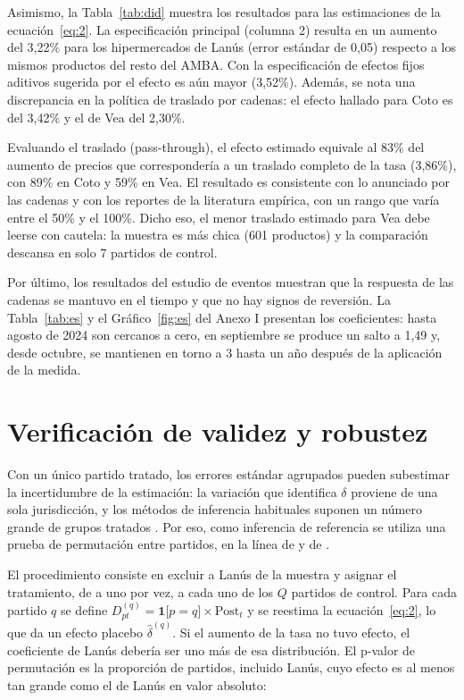 Asimismo, la Tabla~\ref{tab:did} muestra los resultados para las estimaciones de la ecuación~\eqref{eq:2}. La especificación principal (columna 2) resulta en un aumento del 3,22\% para los hipermercados de Lanús (error estándar de 0,05) respecto a los mismos productos del resto del AMBA. Con la especificación de efectos fijos aditivos sugerida por \textcite{cawley2018} el efecto es aún mayor (3,52\%). Además, se nota una discrepancia en la política de traslado por cadenas: el efecto hallado para Coto es del 3,42\% y el de Vea del 2,30\%.

Evaluando el traslado (pass-through), el efecto estimado equivale al 83\% del aumento de precios que correspondería a un traslado completo de la tasa (3,86\%), con 89\% en Coto y 59\% en Vea. El resultado es consistente con lo anunciado por las cadenas y con los reportes de la literatura empírica, con un rango que varía entre el 50\% y el 100\%. Dicho eso, el menor traslado estimado para Vea debe leerse con cautela: la muestra es más chica (601 productos) y la comparación descansa en solo 7 partidos de control.

Por último, los resultados del estudio de eventos muestran que la respuesta de las cadenas se mantuvo en el tiempo y que no hay signos de reversión. La Tabla~\ref{tab:es} y el Gráfico~\ref{fig:es} del Anexo I presentan los coeficientes: hasta agosto de 2024 son cercanos a cero, en septiembre se produce un salto a 1,49 y, desde octubre, se mantienen en torno a 3 hasta un año después de la aplicación de la medida.

\section{Verificación de validez y robustez}

Con un único partido tratado, los errores estándar agrupados pueden subestimar la incertidumbre de la estimación: la variación que identifica \(\delta\) proviene de una sola jurisdicción, y los métodos de inferencia habituales suponen un número grande de grupos tratados \parencite{conley2011,ferman2019}. Por eso, como inferencia de referencia se utiliza una prueba de permutación entre partidos, en la línea de \textcite{conley2011} y de \textcite{abadie2010}.

El procedimiento consiste en excluir a Lanús de la muestra y asignar el tratamiento, de a uno por vez, a cada uno de los \(Q\) partidos de control. Para cada partido \(q\) se define \(D_{pt}^{(q)} = \mathbf{1}\lbrack p = q\rbrack \times \text{Post}_{t}\) y se reestima la ecuación~\eqref{eq:2}, lo que da un efecto placebo \({\widehat{\delta}}^{(q)}\). Si el aumento de la tasa no tuvo efecto, el coeficiente de Lanús debería ser uno más de esa distribución. El p-valor de permutación es la proporción de partidos, incluido Lanús, cuyo efecto es al menos tan grande como el de Lanús en valor absoluto:

